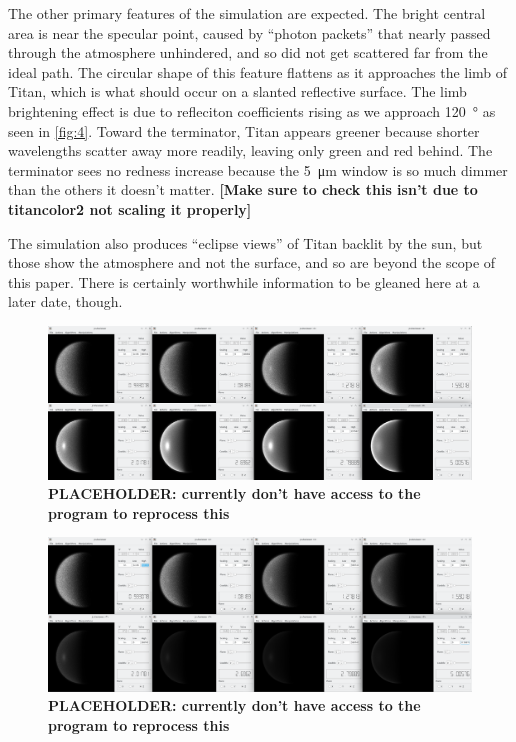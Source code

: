 \documentclass{article}
\begin{document}
The other primary features of the simulation are expected. The bright central area is near the specular point, caused by ``photon packets'' that nearly passed through the atmosphere unhindered, and so did not get scattered far from the ideal path. The circular shape of this feature flattens as it approaches the limb of Titan, which is what should occur on a slanted reflective surface. The limb brightening effect is due to refleciton coefficients rising as we approach \qty{120}{\degree} as seen in \ref{fig:4}. Toward the terminator, Titan appears greener because shorter wavelengths scatter away more readily, leaving only green and red behind. The terminator sees no redness increase because the \qty{5}{\micro\meter} window is so much dimmer than the others it doesn't matter. \textbf{\color{red}[Make sure to check this isn't due to titancolor2 not scaling it properly]\color{black}} 

The simulation also produces ``eclipse views'' of Titan backlit by the sun, but those show the atmosphere and not the surface, and so are beyond the scope of this paper. There is certainly worthwhile information to be gleaned here at a later date, though. 

\begin{figure}[htb]
\includegraphics[scale = 0.2]{AllWindowsUnscaled.png}
\centering
\caption{\textbf{\color{red}PLACEHOLDER: currently don't have access to the program to reprocess this\color{black}} }
\label{fig:7}
\end{figure}
\begin{figure}[htb]
\includegraphics[scale = 0.2]{AllWindowsScaledWithSmallestWavelength.png}
\centering
\caption{\textbf{\color{red}PLACEHOLDER: currently don't have access to the program to reprocess this\color{black}} }
\label{fig:8}
\end{figure}
\end{document}
